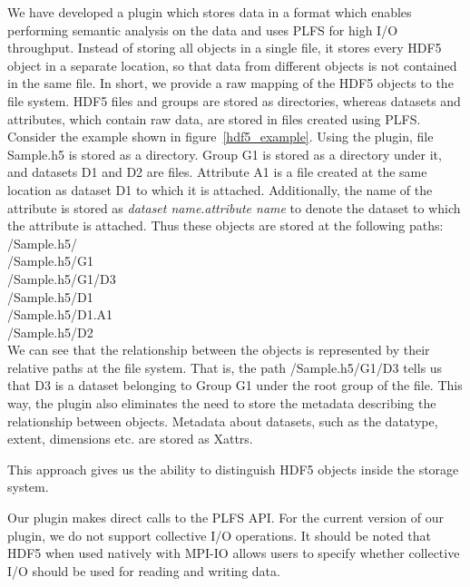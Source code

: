 We have developed a plugin which stores data in a format which enables performing semantic analysis on the data and uses PLFS for high I/O throughput. 
Instead of storing all objects in a single file, it stores every HDF5 object in a separate location, so that data from different objects is not contained in the same file. In short, we provide a raw mapping of the HDF5 objects to the file system. 
HDF5 files and groups are stored as directories, whereas datasets and attributes, which contain raw data, are stored in files created using PLFS. 
Consider the example shown in figure~\ref{hdf5_example}. Using the plugin, file Sample.h5 is stored as a directory. Group G1 is stored as a directory under it, and datasets D1 and D2 are files. Attribute A1 is a file created at the same location as dataset D1 to which it is attached. Additionally, the name of the attribute is stored as \textit{dataset name}.\textit{attribute name} to denote the dataset to which the attribute is attached. Thus these objects are stored at the following paths:\\
/Sample.h5/\\
/Sample.h5/G1\\
/Sample.h5/G1/D3\\
/Sample.h5/D1\\
/Sample.h5/D1.A1\\
/Sample.h5/D2\\

We can see that the relationship between the objects is represented by their relative paths at the file system. That is, the path /Sample.h5/G1/D3 tells us that D3 is a dataset belonging to Group G1 under the root group of the file. This way, the plugin also eliminates the need to store the metadata describing the relationship between objects. Metadata about datasets, such as the datatype, extent, dimensions etc. are stored as Xattrs. 

This approach gives us the ability to distinguish HDF5 objects inside the storage system. 

Our plugin makes direct calls to the PLFS API. For the current version of our plugin, we do not support collective I/O operations. It should be noted that HDF5 when used natively with MPI-IO allows users to specify whether collective I/O should be used for reading and writing data. 

